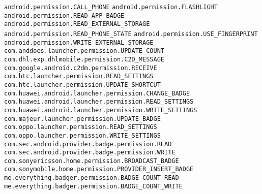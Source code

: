 \texttt{android.permission.CALL\_PHONE}
\newline \texttt{android.permission.FLASHLIGHT}
\newline \texttt{android.permission.READ\_APP\_BADGE}
\newline \texttt{android.permission.READ\_EXTERNAL\_STORAGE}
\newline \texttt{android.permission.READ\_PHONE\_STATE}
\newline \texttt{android.permission.USE\_FINGERPRINT}
\newline \texttt{android.permission.WRITE\_EXTERNAL\_STORAGE}
\newline \texttt{com.anddoes.launcher.permission.UPDATE\_COUNT}
\newline \texttt{com.dhl.exp.dhlmobile.permission.C2D\_MESSAGE}
\newline \texttt{com.google.android.c2dm.permission.RECEIVE}
\newline \texttt{com.htc.launcher.permission.READ\_SETTINGS}
\newline \texttt{com.htc.launcher.permission.UPDATE\_SHORTCUT}
\newline \texttt{com.huawei.android.launcher.permission.CHANGE\_BADGE}
\newline \texttt{com.huawei.android.launcher.permission.READ\_SETTINGS}
\newline \texttt{com.huawei.android.launcher.permission.WRITE\_SETTINGS}
\newline \texttt{com.majeur.launcher.permission.UPDATE\_BADGE}
\newline \texttt{com.oppo.launcher.permission.READ\_SETTINGS}
\newline \texttt{com.oppo.launcher.permission.WRITE\_SETTINGS}
\newline \texttt{com.sec.android.provider.badge.permission.READ}
\newline \texttt{com.sec.android.provider.badge.permission.WRITE}
\newline \texttt{com.sonyericsson.home.permission.BROADCAST\_BADGE}
\newline \texttt{com.sonymobile.home.permission.PROVIDER\_INSERT\_BADGE}
\newline \texttt{me.everything.badger.permission.BADGE\_COUNT\_READ}
\newline \texttt{me.everything.badger.permission.BADGE\_COUNT\_WRITE}